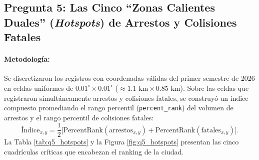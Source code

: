 \subsection{Pregunta 5: Las Cinco ``Zonas Calientes Duales'' (\textit{Hotspots}) de Arrestos y Colisiones Fatales}
\label{subsec:respuesta_q5}

\paragraph{Metodología:} Se discretizaron los registros con coordenadas válidas del primer semestre de 2026 en celdas uniformes de $0.01^\circ \times 0.01^\circ$ ($\approx 1.1\text{ km} \times 0.85\text{ km}$). Sobre las celdas que registraron simultáneamente arrestos y colisiones fatales, se construyó un índice compuesto promediando el rango percentil (\texttt{percent\_rank}) del volumen de arrestos y el rango percentil de colisiones fatales:
\[
\text{Índice}_{x,y} = \frac{1}{2}\Big[\text{PercentRank}(\text{arrestos}_{x,y}) + \text{PercentRank}(\text{fatales}_{x,y})\Big].
\]
La Tabla \ref{tab:q5_hotspots} y la Figura \ref{fig:q5_hotspots} presentan las cinco cuadrículas críticas que encabezan el ranking de la ciudad.

\begin{table}[H]
\centering
\scriptsize
\renewcommand{\arraystretch}{1.2}
\caption{Top 5 de cuadrículas urbanas ($0.01^\circ \times 0.01^\circ$) con mayor concentración conjunta de arrestos y colisiones fatales (2026-I).}
\label{tab:q5_hotspots}
\end{table}

